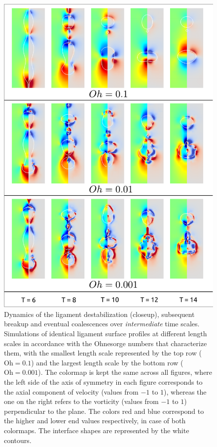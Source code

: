 \begin{figure}
\centering
\includegraphics{plots/ligament_breakup/ohnesorge_compare.pdf}
	\caption{Dynamics of the ligament destabilization (closeup), subsequent breakup 
	and eventual coalescences over \textit{intermediate} time scales.
	Simulations of identical ligament surface profiles
	at different length scales in accordance with the  
	Ohnesorge numbers that characterize them, with the smallest 
	length scale represented by the top row ($\textrm{Oh} = 0.1$) and the largest 
	length scale by the bottom row ($\textrm{Oh} = 0.001$). 
	The colormap is kept the same across all figures, where the left 
	side of the axis of symmetry in each figure corresponds to the axial component of 
	velocity (values from $-1$ to $1$), whereas the one on the right refers to 
	the vorticity (values from $-1$ to $1$) perpendicular to the plane. 
	The colors red and blue correspond to the higher and lower 
	end values respectively, in case of both colormaps. 
	The interface shapes are represented by the white contours.
	}
\label{ohne_comp}
\end{figure}

